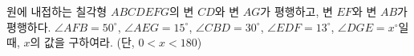 
\numbering 원에 내접하는 칠각형 $ABCDEFG$의 변 $CD$와 변 $AG$가 평행하고, 변 $EF$와 변 $AB$가 평행하다. 
$\angle AFB = 50^\circ$, $\angle AEG = 15^\circ$, $\angle CBD = 30^\circ$, 
$\angle EDF = 13^\circ$, $\angle DGE = x^\circ$일 때,
 $x$의 값을 구하여라. (단, $0 < x < 180$)\\
